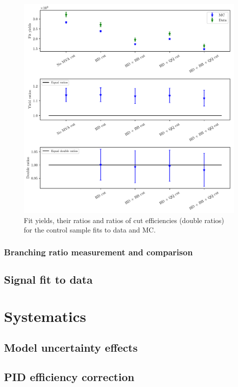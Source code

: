 \documentclass[headings=standardclasses,headings=big,oneside,a4paper,openany,12pt]{scrbook}
\begin{document}
\begin{figure}[H]
	\centering
	\captionsetup{width=0.8\linewidth}
	\includegraphics[width=\linewidth]{fig/cs_fits.pdf}
	\caption{Fit yields, their ratios and ratios of cut efficiencies (double ratios) for the control sample fits to data and MC.}
	\label{fig:cs_fits}
\end{figure}

\subsection{Branching ratio measurement and comparison}

\section{Signal fit to data}

\chapter{Systematics}
\section{Model uncertainty effects}
\section{PID efficiency correction}
\end{document}
